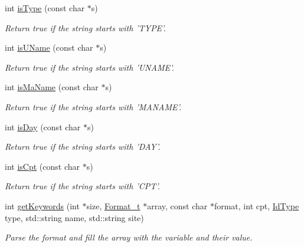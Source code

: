 \begin{DoxyCompactItemize}
int \hyperlink{namespacevishnu_abaf2c02608b3d96f1f883d65966595a5}{isType} (const char $\ast$s)
\begin{DoxyCompactList}\small\item\em Return true if the string starts with 'TYPE'. \item\end{DoxyCompactList}\item 
int \hyperlink{namespacevishnu_ac123696febe0c4b8fa9f6d59daa6062b}{isUName} (const char $\ast$s)
\begin{DoxyCompactList}\small\item\em Return true if the string starts with 'UNAME'. \item\end{DoxyCompactList}\item 
int \hyperlink{namespacevishnu_ad10441f9e198c7d70038dcd74963dc54}{isMaName} (const char $\ast$s)
\begin{DoxyCompactList}\small\item\em Return true if the string starts with 'MANAME'. \item\end{DoxyCompactList}\item 
int \hyperlink{namespacevishnu_a11a59f26c9f250498ef8aed73e316c8b}{isDay} (const char $\ast$s)
\begin{DoxyCompactList}\small\item\em Return true if the string starts with 'DAY'. \item\end{DoxyCompactList}\item 
int \hyperlink{namespacevishnu_a9f8370bcc63bc78bd464447eecbee191}{isCpt} (const char $\ast$s)
\begin{DoxyCompactList}\small\item\em Return true if the string starts with 'CPT'. \item\end{DoxyCompactList}\item 
int \hyperlink{namespacevishnu_a04e3438b8bba4e8074e5102cccfd6cd1}{getKeywords} (int $\ast$size, \hyperlink{classFormat__t}{Format\_\-t} $\ast$array, const char $\ast$format, int cpt, \hyperlink{namespacevishnu_aff8a694c2bc2b55465a31b4bf00f58c1}{IdType} type, std::string name, std::string site)
\begin{DoxyCompactList}\small\item\em Parse the format and fill the array with the variable and their value. \item\end{DoxyCompactList}\item 

\end{DoxyCompactItemize}
